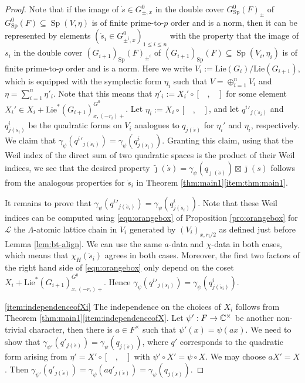 \documentclass{article}
\def\cL{\mathcal{L}}
\newcommand{\bC}{\mathbb{C}}
\DeclareMathOperator{\Sp}{Sp}
\theoremstyle{definition}
\numberwithin{equation}{subsection}
\renewcommand{\-}{\hyp{}}
\begin{document}
\begin{proof}
	Note that if the image of $\dot s \in G^0_{\pm, x}$ in the double cover $G^0_{\Sp}(F)_\pm$ of $G^0_{\Sp}(F) \subseteq \Sp(V, \eta)$ is of finite prime-to-$p$ order and is a norm, then it can be represented by elements $(\dot s_i \in G^0_{\pm^i,x})_{1 \leq i \leq n}$ with the property that the image of $\dot s_i$ in the double cover $(G_{i+1})_{\Sp}(F)_{\pm^i}$ of $(G_{i+1})_{\Sp}(F)\subseteq \Sp(V_i, \eta_i)$ is of finite prime-to-$p$ order and is a norm. Here we write $V_i:=\mathrm{Lie}(G_i)/\mathrm{Lie}(G_{i+1})$, which is equipped with the symplectic form $\eta_i$ such that  $V=\oplus_{i=1}^n V_i$ and $\eta = \sum_{i=1}^n \eta'_i$. Note that this means that  $\eta'_i:= X_i' \circ [\phantom{X},\phantom{X}]$ for some element $X_i' \in X_i + \mathrm{Lie}^*(G_{i+1})^{G^0}_{x,(-r_i)+}$. Let $\eta_i:= X_i \circ [\phantom{X},\phantom{X}]$, and let ${q^i}'_{j(\dot s_i)}$ and $q^{i}_{j(\dot s_i)}$ be the quadratic forms on $V_i$ analogues to $q_{j(\dot s)}$ for $\eta_i'$ and $\eta_i$, respectively.  We claim that  $\gamma_\psi({q^i}'_{j(\dot s_i)})=\gamma_\psi(q^{i}_{j(\dot s_i)})$. Granting this claim, using that the Weil index of the direct sum of two quadratic spaces is the product of their Weil indices, we see that the desired property $\tilde\jmath(\dot s) = \gamma_\psi(q_{\jmath(\dot s)}) \boxtimes \bar\jmath(s)$ follows from the analogous properties for $\dot s_i$ in Theorem \ref{thm:main1}\ref{item:thm:main1}.
	
	It remains to prove that $\gamma_\psi({q^i}'_{j(\dot s_i)})=\gamma_\psi(q^{i}_{j(\dot s_i)})$. Note that these Weil indices can be computed using \eqref{eqn:orangebox} of Proposition \ref{pro:orangebox} for $\cL$ the $\Lambda$-atomic lattice chain in $V_i$ generated by $(V_i)_{x,r_i/2}$ as defined just before Lemma \ref{lem:bt-align}. We can use the same $a$-data and $\chi$-data in both cases, which means that $\chi_H(\dot s_i)$ agrees in both cases. Moreover, the first two factors of the right hand side of \eqref{eqn:orangebox} only depend on the coset $X_i+ \mathrm{Lie}^*(G_{i+1})^{G^0}_{x,(-r_i)+}$. Hence $\gamma_\psi({q^i}'_{j(\dot s_i)})=\gamma_\psi(q^{i}_{j(\dot s_i)})$.


	\ref{item:independenceofXi} The independence on the choices of $X_i$ follows from Theorem \ref{thm:main1}\ref {item:independenceofX}. Let $\psi': F \ra \bC^\times$ be another non-trivial character, then there is $a \in F^\times$ such that $\psi'(x)=\psi(ax)$. We need to show that $\gamma_{\psi'}(q'_{j(\dot s)})=\gamma_{\psi}(q_{j(\dot s)})$, where $q'$ corresponds to the quadratic form arising from $\eta' = X' \circ [\phantom{X}, \phantom{X}]$ with $\psi' \circ X'= \psi \circ X$. We may choose $aX'=X$. Then $\gamma_{\psi'}(q'_{j(\dot s)})=\gamma_{\psi}(aq'_{j(\dot s)})=\gamma_{\psi}(q_{j(\dot s)})$.
	

\end{proof}
\end{document}
